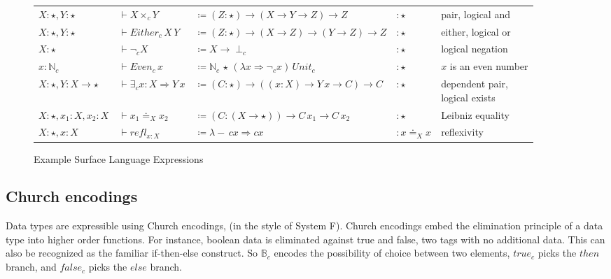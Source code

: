 \begin{sidewaysfigure}
\begin{tabular}{lllll}
$X:\star,Y:\star$ & $\vdash X\times_{c}Y$ & $\coloneqq\left(Z:\star\right)\rightarrow(X\rightarrow Y\rightarrow Z)\rightarrow Z$ & $:\star$ & pair, logical and\tabularnewline
$X:\star,Y:\star$ & $\vdash Either_{c}\,X\,Y$ & $\coloneqq\left(Z:\star\right)\rightarrow(X\rightarrow Z)\rightarrow(Y\rightarrow Z)\rightarrow Z$ & $:\star$ & either, logical or\tabularnewline
$X:\star$ & $\vdash\lnot_{c}X$ & $\coloneqq X\rightarrow\perp_{c}$ & $:\star$ & logical negation\tabularnewline
$x:\mathbb{N}_{c}$ & $\vdash Even_{c}\,x$ & $\coloneqq\mathbb{N}_{c}\,\star\,\left(\lambda x\Rightarrow\lnot_{c}x\right)\,Unit_{c}$ & $:\star$ & $x$ is an even number\tabularnewline
$X:\star,Y:X\rightarrow\star$ & $\vdash\exists_{c}x:X\Rightarrow Y\,x$ & $\coloneqq\left(C:\star\right)\rightarrow\left((x:X)\rightarrow Y\,x\rightarrow C\right)\rightarrow C$ & $:\star$ & \makecell[l]{dependent pair,\\ logical exists}\tabularnewline
$X:\star,x_{1}:X,x_{2}:X$ & $\vdash x_{1}\doteq_{X}x_{2}$ & $\coloneqq\left(C:\left(X\rightarrow\star\right)\right)\rightarrow C\,x_{1}\rightarrow C\,x_{2}$ & $:\star$ & Leibniz equality\tabularnewline
$X:\star,x:X$ & $\vdash refl_{x:X}$ & $\coloneqq\lambda-\,cx\Rightarrow cx$ & $:x\doteq_{X}x$ & reflexivity\tabularnewline
\end{tabular}


\caption{Example Surface Language Expressions}
\label{fig:surface-examples}
\end{sidewaysfigure}

\subsection{Church encodings}

Data types are expressible using Church encodings, (in the style of System F).
Church encodings embed the elimination principle of a data type into higher order functions.
For instance, boolean data is eliminated against true and false, two tags with no additional data.
This can also be recognized as the familiar if-then-else construct. 
So $\mathbb{B}_{c}$ encodes the possibility of choice between two elements, $true_{c}$ picks the $then$ branch, and $false_{c}$ picks the $else$ branch.

